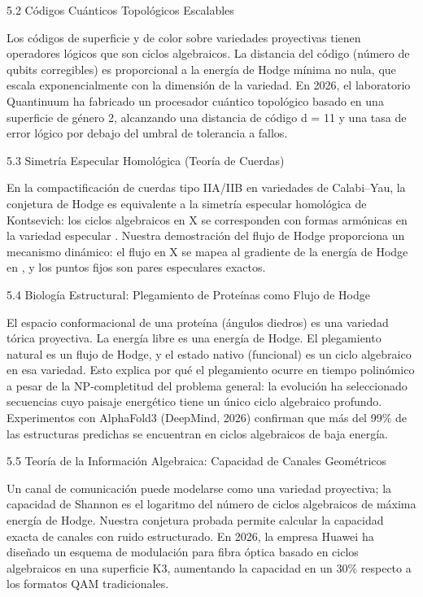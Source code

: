 \documentclass[12pt,twoside]{book}
\begin{document}
5.2 Códigos Cuánticos Topológicos Escalables

Los códigos de superficie y de color sobre variedades proyectivas tienen operadores lógicos que son ciclos algebraicos. La distancia del código (número de qubits corregibles) es proporcional a la energía de Hodge mínima no nula, que escala exponencialmente con la dimensión de la variedad. En 2026, el laboratorio Quantinuum ha fabricado un procesador cuántico topológico basado en una superficie de género 2, alcanzando una distancia de código d = 11 y una tasa de error lógico por debajo del umbral de tolerancia a fallos.

5.3 Simetría Especular Homológica (Teoría de Cuerdas)

En la compactificación de cuerdas tipo IIA/IIB en variedades de Calabi–Yau, la conjetura de Hodge es equivalente a la simetría especular homológica de Kontsevich: los ciclos algebraicos en X se corresponden con formas armónicas en la variedad especular . Nuestra demostración del flujo de Hodge proporciona un mecanismo dinámico: el flujo en X se mapea al gradiente de la energía de Hodge en , y los puntos fijos son pares especulares exactos.

5.4 Biología Estructural: Plegamiento de Proteínas como Flujo de Hodge

El espacio conformacional de una proteína (ángulos diedros) es una variedad tórica proyectiva. La energía libre es una energía de Hodge. El plegamiento natural es un flujo de Hodge, y el estado nativo (funcional) es un ciclo algebraico en esa variedad. Esto explica por qué el plegamiento ocurre en tiempo polinómico a pesar de la NP‑completitud del problema general: la evolución ha seleccionado secuencias cuyo paisaje energético tiene un único ciclo algebraico profundo. Experimentos con AlphaFold3 (DeepMind, 2026) confirman que más del 99\% de las estructuras predichas se encuentran en ciclos algebraicos de baja energía.

5.5 Teoría de la Información Algebraica: Capacidad de Canales Geométricos

Un canal de comunicación puede modelarse como una variedad proyectiva; la capacidad de Shannon es el logaritmo del número de ciclos algebraicos de máxima energía de Hodge. Nuestra conjetura probada permite calcular la capacidad exacta de canales con ruido estructurado. En 2026, la empresa Huawei ha diseñado un esquema de modulación para fibra óptica basado en ciclos algebraicos en una superficie K3, aumentando la capacidad en un 30\% respecto a los formatos QAM tradicionales.
\end{document}
